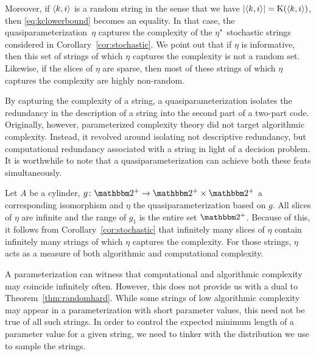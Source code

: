 Moreover, if ${\langle k, i\rangle}$ is a random string in the sense that we have ${\lvert{\langle k, i\rangle}\rvert} = \operatorname{K}({\langle k, i\rangle})$, then \eqref{eq:kclowerbound} becomes an equality.
In that case, the quasiparameterization~$\eta$ captures the complexity of the $\eta$"~stochastic strings considered in Corollary~\ref{cor:stochastic}.
We point out that if $\eta$ is informative, then this set of strings of which $\eta$ captures the complexity is not a random set.
Likewise, if the slices of $\eta$ are sparse, then most of these strings of which $\eta$ captures the complexity are highly non-random.

\begin{example}[continued]
\label{ex:simultaneous}%
  By capturing the complexity of a string, a quasiparameterization isolates the redundancy in the description of a string into the second part of a two-part code.
  Originally, however, parameterized complexity theory did not target algorithmic complexity.
  Instead, it revolved around isolating not descriptive redundancy, but computational redundancy associated with a string in light of a decision problem.
  It is worthwhile to note that a quasiparameterization can achieve both these feats simultaneously.

  Let $A$ be a \pdash{}cylinder, $g\colon \binary^+ \to \binary^+ \times \binary^+$ a corresponding isomorphism and $\eta$ the quasiparameterization based on $g$.
  All slices of $\eta$ are infinite and the range of $g_1$ is the entire set $\binary^+$.
  Because of this, it follows from Corollary~\ref{cor:stochastic} that infinitely many slices of $\eta$ contain infinitely many strings of which $\eta$ captures the complexity.
  For those strings, $\eta$ acts as a measure of both algorithmic and computational complexity.
\end{example}

A parameterization can witness that computational and algorithmic complexity may coincide infinitely often.
However, this does not provide us with a dual to Theorem~\ref{thm:randomhard}.
While some strings of low algorithmic complexity may appear in a parameterization with short parameter values, this need not be true of all such strings.
In order to control the expected minimum length of a parameter value for a given string, we need to tinker with the distribution we use to sample the strings.

